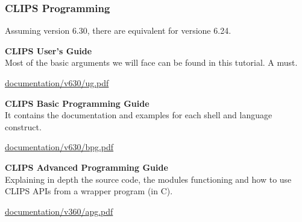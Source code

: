 \documentclass[xcolor={usenames,dvipsnames,svgnames}, compress]{beamer}
\begin{document}
  \begin{frame}
    
    \frametitle{CLIPS Programming}
    
    Assuming version \textsf{6.30}, there are equivalent for versione \textsf{6.24}.\par\bigskip
    
    
    \textbf{CLIPS User's Guide}\\
    Most of the basic arguments we will face can be found in this
    tutorial. A must.
    \begin{flushright}
      \vspace{-5pt}
      \href{http://clipsrules.sourceforge.net/documentation/v630/ug.pdf}{documentation/v630/ug.pdf}
    \end{flushright}
    
    
    
    \textbf{CLIPS Basic Programming Guide}\\
    It contains the documentation and examples for each shell and
    language construct.
    \begin{flushright}
      \vspace{-5pt}
      \href{http://clipsrules.sourceforge.net/documentation/v630/bpg.pdf}{documentation/v630/bpg.pdf}
    \end{flushright}
    
    
    \textbf{CLIPS Advanced Programming Guide}\\
    Explaining in depth the source code, the modules functioning and how to use CLIPS APIs from a wrapper program (in C).
    \begin{flushright}
      \vspace{-5pt}
      \href{http://clipsrules.sourceforge.net/documentation/v630/apg.pdf}{documentation/v360/apg.pdf}
    \end{flushright}
    
  \end{frame}
\end{document}
